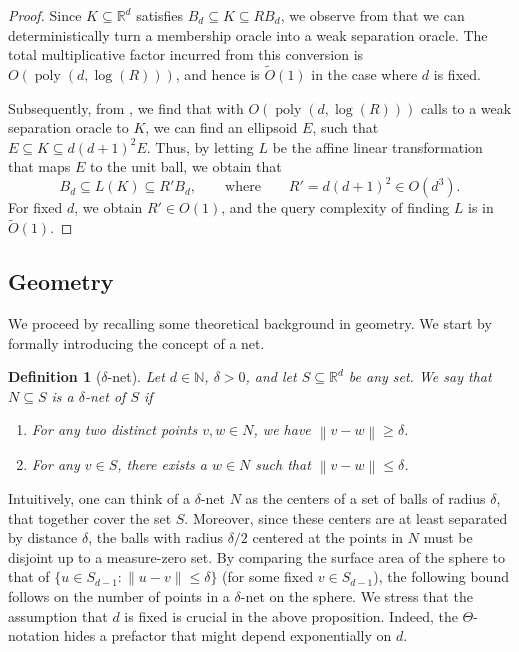 \documentclass[11pt]{article}
\newtheorem{definition}[theorem]{Definition}
\newcommand{\N}{\ensuremath{\mathbb{N}}}
\newcommand{\R}{\ensuremath{\mathbb{R}}}
\newcommand{\norm}[1]{\ensuremath{\left\|#1\right\|}}
\DeclareMathOperator{\poly}{poly}
\begin{document}
    \begin{proof}
        Since $K \subseteq \R^d$ satisfies $B_d \subseteq K \subseteq RB_d$, we observe from \cite[Figure~4.1]{grotschel2012geometric} that we can deterministically turn a membership oracle into a weak separation oracle. The total multiplicative factor incurred from this conversion is $O(\poly(d,\log(R)))$, and hence is $\widetilde{O}(1)$ in the case where $d$ is fixed.

        Subsequently, from \cite[Theorem~4.6.1]{grotschel2012geometric}, we find that with $O(\poly(d,\log(R)))$ calls to a weak separation oracle to $K$, we can find an ellipsoid $E$, such that $E \subseteq K \subseteq d(d+1)^2E$. Thus, by letting $L$ be the affine linear transformation that maps $E$ to the unit ball, we obtain that
        \[B_d \subseteq L(K) \subseteq R'B_d, \qquad \text{where} \qquad R' = d(d+1)^2 \in O(d^3).\]
        For fixed $d$, we obtain $R' \in O(1)$, and the query complexity of finding $L$ is in $\widetilde{O}(1)$.
    \end{proof}

    \subsection{Geometry}

    We proceed by recalling some theoretical background in geometry. We start by formally introducing the concept of a net.

    \begin{definition}[$\delta$-net]
        Let $d \in \N$, $\delta > 0$, and let $S \subseteq \R^d$ be any set. We say that $N \subseteq S$ is a $\delta$-net of $S$ if
        \begin{enumerate}[nosep]
            \item For any two distinct points $v,w \in N$, we have $\norm{v-w} \geq \delta$.
            \item For any $v \in S$, there exists a $w \in N$ such that $\norm{v - w} \leq \delta$.
        \end{enumerate}
    \end{definition}

    Intuitively, one can think of a $\delta$-net $N$ as the centers of a set of balls of radius $\delta$, that together cover the set $S$. Moreover, since these centers are at least separated by distance $\delta$, the balls with radius $\delta/2$ centered at the points in $N$ must be disjoint up to a measure-zero set. By comparing the surface area of the sphere to that of $\{u \in S_{d-1}: \|u-v\| \leq \delta\}$ (for some fixed $v \in S_{d-1}$), the following bound follows on the number of points in a $\delta$-net on the sphere. We stress that the assumption that $d$ is fixed is crucial in the above proposition. Indeed, the $\Theta$-notation hides a prefactor that might depend exponentially on $d$.
\end{document}
